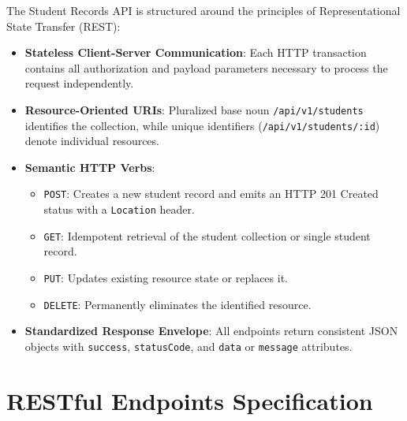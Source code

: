 \documentclass[11pt,a4paper]{article}
\begin{document}
The Student Records API is structured around the principles of Representational State Transfer (REST):
\begin{itemize}
    \item \textbf{Stateless Client-Server Communication}: Each HTTP transaction contains all authorization and payload parameters necessary to process the request independently.
    \item \textbf{Resource-Oriented URIs}: Pluralized base noun \texttt{/api/v1/students} identifies the collection, while unique identifiers (\texttt{/api/v1/students/:id}) denote individual resources.
    \item \textbf{Semantic HTTP Verbs}:
    \begin{itemize}
        \item \texttt{POST}: Creates a new student record and emits an HTTP 201 Created status with a \texttt{Location} header.
        \item \texttt{GET}: Idempotent retrieval of the student collection or single student record.
        \item \texttt{PUT}: Updates existing resource state or replaces it.
        \item \texttt{DELETE}: Permanently eliminates the identified resource.
    \end{itemize}
    \item \textbf{Standardized Response Envelope}: All endpoints return consistent JSON objects with \texttt{success}, \texttt{statusCode}, and \texttt{data} or \texttt{message} attributes.
\end{itemize}

\section{RESTful Endpoints Specification}
\end{document}

